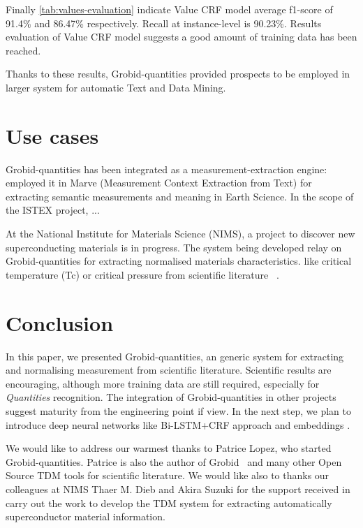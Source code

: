 \documentclass[sigconf]{acmart}
\begin{document}
Finally \ref{tab:values-evaluation} indicate Value CRF model average f1-score of 91.4\% and 86.47\% respectively. Recall at instance-level is 90.23\%. Results evaluation of Value CRF model suggests a good amount of training data has been reached.

Thanks to these results, Grobid-quantities provided prospects to be employed in larger system for automatic Text and Data Mining. 

\section{Use cases}
\label{sec:use_cases}
Grobid-quantities has been integrated as a measurement-extraction engine: \cite{hundman2017measurement} employed it in Marve (Measurement Context Extraction from Text) for extracting semantic measurements and meaning in Earth Science. 
In the scope of the ISTEX project, ...

At the National Institute for Materials Science (NIMS), a project to discover new superconducting materials is in progress. The system being developed relay on Grobid-quantities for extracting normalised materials characteristics.  like critical temperature (Tc) or critical pressure from scientific literature ~\cite{foppiano2019proposal}. 

\section{Conclusion}
\label{sec:conclusion}
In this paper, we presented Grobid-quantities, an generic system for extracting and normalising measurement from scientific literature. Scientific results are encouraging, although more training data are still required, especially for \textit{Quantities} recognition. The integration of Grobid-quantities in other projects suggest maturity from the engineering point if view. In the next step, we plan to introduce deep neural networks like Bi-LSTM+CRF approach and embeddings \cite{delft}. 

\begin{acks}
We would like to address our warmest thanks to Patrice Lopez, who started Grobid-quantities. Patrice is also the author of Grobid~\cite{GROBID} and many other Open Source TDM tools for scientific literature. 
We would like also to thanks our colleagues at NIMS Thaer M. Dieb and Akira Suzuki for the support received in carry out the work to develop the TDM system for extracting automatically superconductor material information.
\end{acks}




\end{document}
